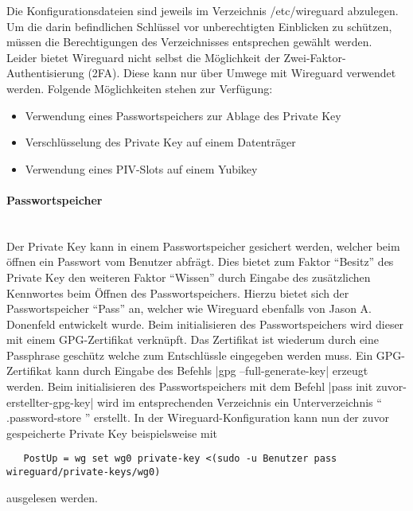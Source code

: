 \newpage
\noindent Die Konfigurationsdateien sind jeweils im Verzeichnis /etc/wireguard abzulegen. Um die darin befindlichen Schl\"ussel vor unberechtigten Einblicken zu sch\"utzen, m\"ussen die Berechtigungen des Verzeichnisses entsprechen gew\"ahlt werden. \\

\noindent Leider bietet Wireguard nicht selbst die M\"oglichkeit der Zwei-Faktor-Authentisierung (2FA). Diese kann nur \"uber Umwege mit Wireguard verwendet werden. Folgende M\"oglichkeiten stehen zur Verf\"ugung:
   \begin{itemize}
      \item Verwendung eines Passwortspeichers zur Ablage des Private Key
      \item Verschl\"usselung des Private Key auf einem Datentr\"ager
			\item Verwendung eines PIV-Slots auf einem Yubikey
   \end{itemize}

\paragraph{Passwortspeicher} 
\noindent \\Der Private Key kann in einem Passwortspeicher gesichert werden, welcher beim \"offnen ein Passwort vom Benutzer abfr\"agt. Dies bietet zum Faktor "`Besitz"' des Private Key den weiteren Faktor "`Wissen"' durch Eingabe des zus\"atzlichen Kennwortes beim \"Offnen des Passwortspeichers. Hierzu bietet sich der Passwortspeicher "`Pass"' an, welcher wie Wireguard ebenfalls von Jason A. Donenfeld entwickelt wurde. Beim initialisieren des Passwortspeichers wird dieser mit einem GPG-Zertifikat verknüpft. Das Zertifikat ist wiederum durch eine Passphrase gesch\"utz welche zum Entschlüssle eingegeben werden muss.
Ein GPG-Zertifikat kann durch Eingabe des Befehls |gpg --full-generate-key| erzeugt werden. Beim initialisieren des Passwortspeichers mit dem Befehl |pass init zuvor-erstellter-gpg-key| wird im entsprechenden Verzeichnis ein Unterverzeichnis \enquote{ .password-store } erstellt. In der Wireguard-Konfiguration kann nun der zuvor gespeicherte Private Key beispielsweise mit 
\begin{verbatim}
   PostUp = wg set wg0 private-key <(sudo -u Benutzer pass wireguard/private-keys/wg0)
\end{verbatim}
ausgelesen werden.

